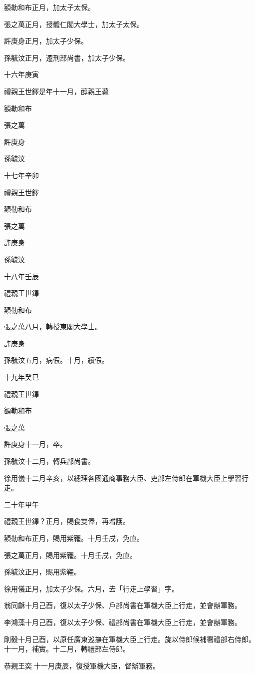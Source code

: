\begin{pinyinscope}
額勒和布正月，加太子太保。

張之萬正月，授體仁閣大學士，加太子太保。

許庚身正月，加太子少保。

孫毓汶正月，遷刑部尚書，加太子少保。

十六年庚寅

禮親王世鐸是年十一月，醇親王薨

額勒和布

張之萬

許庚身

孫毓汶

十七年辛卯

禮親王世鐸

額勒和布

張之萬

許庚身

孫毓汶

十八年壬辰

禮親王世鐸

額勒和布

張之萬八月，轉授東閣大學士。

許庚身

孫毓汶五月，病假。十月，續假。

十九年癸巳

禮親王世鐸

額勒和布

張之萬

許庚身十一月，卒。

孫毓汶十二月，轉兵部尚書。

徐用儀十二月辛亥，以總理各國通商事務大臣、吏部左侍郎在軍機大臣上學習行走。

二十年甲午

禮親王世鐸？正月，賜食雙俸，再增護。

額勒和布正月，賜用紫韁。十月壬戌，免直。

張之萬正月，賜用紫韁。十月壬戌，免直。

孫毓汶正月，賜用紫韁。

徐用儀正月，加太子少保。六月，去「行走上學習」字。

翁同龢十月己酉，復以太子少保、戶部尚書在軍機大臣上行走，並會辦軍務。

李鴻藻十月己酉，復以太子少保、禮部尚書在軍機大臣上行走，並會辦軍務。

剛毅十月己酉，以原任廣東巡撫在軍機大臣上行走。旋以侍郎候補署禮部右侍郎。十一月，補實。十二月，轉禮部左侍郎。

恭親王奕十一月庚辰，復授軍機大臣，督辦軍務。


\end{pinyinscope}
